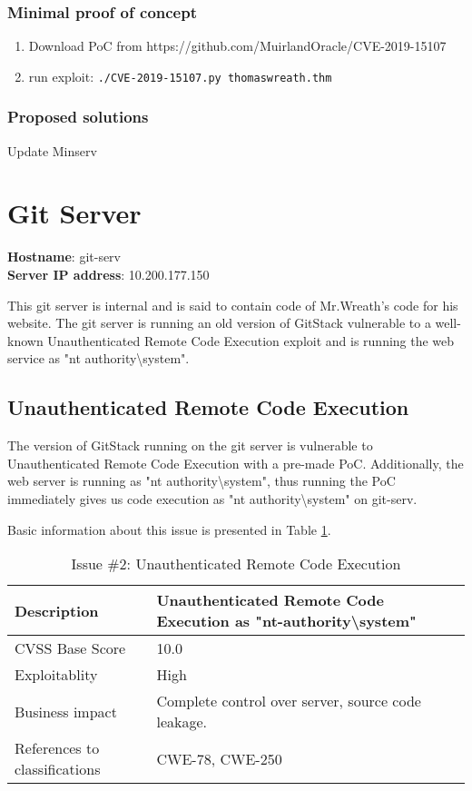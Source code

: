 \subsubsection{Minimal proof of concept}
\begin{enumerate}
    \item Download PoC from https://github.com/MuirlandOracle/CVE-2019-15107
    \item run exploit: \lstinline{./CVE-2019-15107.py thomaswreath.thm}
\end{enumerate}

\subsubsection{Proposed solutions} \label{solution:issue-1}
Update Minserv

\newpage

\section{Git Server}
\textbf{Hostname}: git-serv\\
\textbf{Server IP address}: 10.200.177.150

This git server is internal and is said to contain code of Mr.Wreath's code for his website. The git server is running an old version of GitStack vulnerable to a well-known Unauthenticated Remote Code Execution exploit and is running the web service as "nt authority\textbackslash system".

\subsection{Unauthenticated Remote Code Execution} \label{ss:issue-2}
The version of GitStack running on the git server is vulnerable to Unauthenticated Remote Code Execution with a pre-made PoC. Additionally, the web server is running as "nt authority\textbackslash system", thus running the PoC immediately gives us code execution as "nt authority\textbackslash system" on git-serv.

Basic information about this issue is presented in Table \ref{tbl:issue-2}.
\begin{table}[h]
	\centering
	\begin{tabular}{| l | p{10cm} |}
		\hline
		Description & Unauthenticated Remote Code Execution as "nt-authority\textbackslash system" \\
		\hline
		CVSS Base Score & 10.0 \\
		\hline
		Exploitablity & High \\
		\hline
		Business impact & Complete control over server, source code leakage.  \\
		\hline
    References to classifications & CWE-78, CWE-250 \\
		\hline
	\end{tabular}
\caption{Issue \#2: Unauthenticated Remote Code Execution}
\label{tbl:issue-2}
\end{table}

